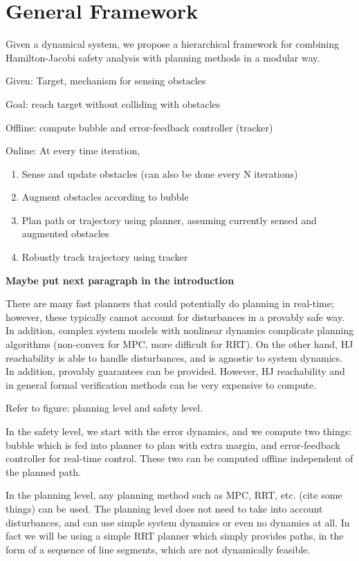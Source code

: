 \section{General Framework \label{sec:framework}}
Given a dynamical system, we propose a hierarchical framework for combining Hamilton-Jacobi safety analysis with planning methods in a modular way.

Given: Target, mechanism for sensing obstacles

Goal: reach target without colliding with obstacles

Offline: compute bubble and error-feedback controller (tracker)

Online: At every time iteration,
\begin{enumerate}
  \item Sense and update obstacles (can also be done every N iterations)
  \item Augment obstacles according to bubble
  \item Plan path or trajectory using planner, assuming currently sensed and augmented obstacles
  \item Robustly track trajectory using tracker
\end{enumerate}


\textbf{Maybe put next paragraph in the introduction}

There are many fast planners that could potentially do planning in real-time; however, these typically cannot account for disturbances in a provably safe way. In addition, complex system models with nonlinear dynamics complicate planning algorithms (non-convex for MPC, more difficult for RRT). On the other hand, HJ reachability is able to handle disturbances, and is agnostic to system dynamics. In addition, provably guarantees can be provided. However, HJ reachability and in general formal verification methods can be very expensive to compute.

Refer to figure: planning level and safety level. 

In the safety level, we start with the error dynamics, and we compute two things: bubble which is fed into planner to plan with extra margin, and error-feedback controller for real-time control. These two can be computed offline independent of the planned path.

In the planning level, any planning method such as MPC, RRT, etc. (cite some things) can be used. The planning level does not need to take into account disturbances, and can use simple system dynamics or even no dynamics at all. In fact we will be using a simple RRT planner which simply provides paths, in the form of a sequence of line segments, which are not dynamically feasible. 

